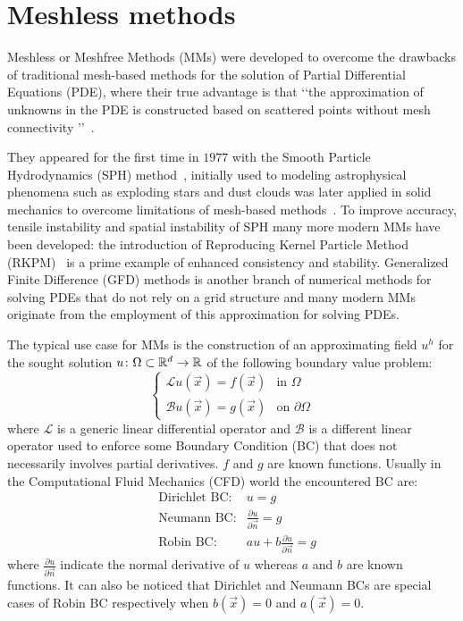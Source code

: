 \chapter{Meshless methods}\label{chap:meshless_methods}

Meshless or Meshfree Methods (MMs) were developed to overcome the drawbacks of traditional mesh-based methods for the solution of Partial Differential Equations (PDE), where their true advantage is that \lq\lq the approximation of unknowns in the PDE is constructed based on scattered points without mesh connectivity \rq\rq~\cite{Chen:meshless_overview_after_20_years}.

They appeared for the first time in $1977$ with the Smooth Particle Hydrodynamics (SPH) method~\cite{Belytschko:meshless_overview}, initially used to modeling astrophysical phenomena such as exploding stars and dust clouds was later applied in solid mechanics to overcome limitations of mesh-based methods~\cite{Benz:SPH_on_solid_mechanics}. To improve accuracy, tensile instability and spatial instability of SPH many more modern MMs have been developed: the introduction of Reproducing Kernel Particle Method (RKPM)~\cite{Liu:RKPM} is a prime example of enhanced consistency and stability.
Generalized Finite Difference (GFD) methods is another branch of numerical methods for solving PDEs that do not rely on a grid structure and many modern MMs originate from the employment of this approximation for solving PDEs.

The typical use case for MMs is the construction of an approximating field $u^{h}$ for the sought solution $u\colon\Omega\subset \mathbb{R}^{d}\to\mathbb{R}$ of the following boundary value problem:
\begin{equation}
	\label{eqn:generic_continous_PDE}
	\begin{cases}
		\mathcal{L} u(\vec{x})  = f(\vec{x})		& \text{in $\Omega$} \\
		\mathcal{B}u(\vec{x})   = g(\vec{x})	     & \text{on $\partial\Omega$}
	\end{cases}
\end{equation}
where $\mathcal{L}$ is a generic linear differential operator and $\mathcal{B}$ is a different linear operator used to enforce some Boundary Condition (BC) that does not necessarily involves partial derivatives. $f$ and $g$ are known functions.
Usually in the Computational Fluid Mechanics (CFD) world the encountered BC are:
\begin{align}
	& \text{Dirichlet BC:} & u=g  \\
	& \text{Neumann BC:} & \frac{\partial u}{\partial \vec{n}} = g  \\
	& \text{Robin BC:} & au + b\frac{\partial u}{\partial \vec{n}} = g
\end{align}
where $\frac{\partial u}{\partial \vec{n}}$ indicate the normal derivative of $u$ whereas $a$ and $b$ are known functions. It can also be noticed that Dirichlet and Neumann BCs are special cases of Robin BC respectively when $b(\vec{x})=0$ and $a(\vec{x})=0$.

